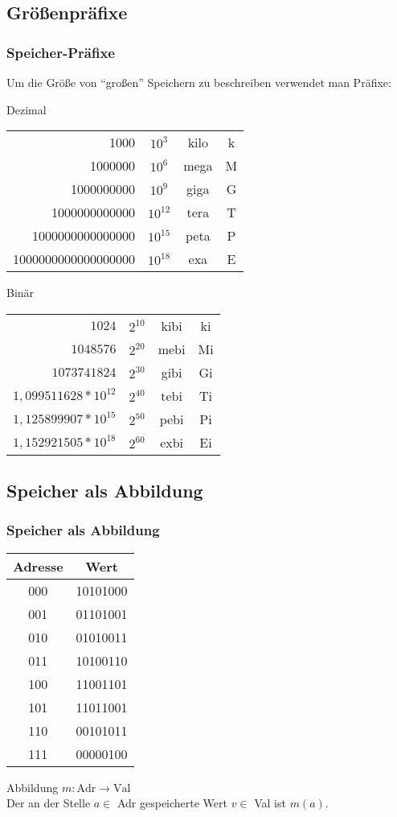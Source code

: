 \subsection{Größenpräfixe}
\begin{frame}[plain]
	\frametitle{Speicher-Präfixe}
	Um die Größe von "`großen"' Speichern zu beschreiben verwendet man Präfixe:
	\begin{block}{Dezimal}
		\begin{tabular}{rccc}
			1000&$10^{3}$&kilo&k\\
			1000000&$10^{6}$&mega&M\\
			1000000000&$10^{9}$&giga&G\\
			1000000000000&$10^{12}$&tera&T\\
			1000000000000000&$10^{15}$&peta&P\\
			1000000000000000000&$10^{18}$&exa&E\\
		\end{tabular}

	\end{block}
	\begin{block}{Binär}
		\begin{tabular}{rccc}
			$1024$&$2^{10}$&kibi&ki\\
			$1048576$&$2^{20}$&mebi&Mi\\
			$1073741824$&$2^{30}$&gibi&Gi\\
			$1,099511628*10^{12}$&$2^{40}$&tebi&Ti\\
			$1,125899907*10^{15}$&$2^{50}$&pebi&Pi\\
			$1,152921505*10^{18}$&$2^{60}$&exbi&Ei\\
		\end{tabular}
	\end{block}

\end{frame}


\subsection{Speicher als Abbildung}
\begin{frame}
	\frametitle{Speicher als Abbildung}
	\begin{tabular}{cc}
		\toprule
		Adresse&Wert\\
		\midrule
		000&10101000\\
		001&01101001\\
		010&01010011\\
		011&10100110\\
		100&11001101\\
		101&11011001\\
		110&00101011\\
		111&00000100\\
		\bottomrule
	\end{tabular}
	\begin{block}{Abbildung}
		$m:\text{Adr}\rightarrow\text{Val}$\\
		\vspace{.2cm}
		Der an der Stelle $a\in$ Adr gespeicherte Wert $v\in$ Val ist $m(a)$.
	\end{block}
\end{frame}

